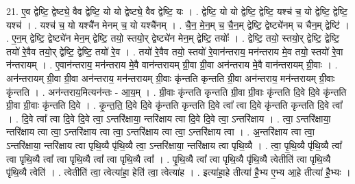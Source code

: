 \documentclass[17pt]{extarticle}
\begin{document}
21. ए॒व द्वेष्टि॒ द्वेष्ट्ये॒ वैव द्वेष्टि॒ यो यो द्वेष्ट्ये॒ वैव द्वेष्टि॒ यः । . द्वेष्टि॒ यो यो द्वेष्टि॒ द्वेष्टि॒ यश्च॑ च॒ यो द्वेष्टि॒ द्वेष्टि॒ यश्च॑ । . यश्च॑ च॒ यो यश्चै॑न मेनम् च॒ यो यश्चै॑नम् । . चै॒न॒ मे॒न॒म् च॒ चै॒न॒म् द्वेष्टि॒ द्वेष्ट्ये॑नम् च चैन॒म् द्वेष्टि॑ । . ए॒न॒म् द्वेष्टि॒ द्वेष्ट्ये॑न मेन॒म् द्वेष्टि॒ तयो॒ स्तयो॒र् द्वेष्ट्ये॑न मेन॒म् द्वेष्टि॒ तयोः᳚ । . द्वेष्टि॒ तयो॒ स्तयो॒र् द्वेष्टि॒ द्वेष्टि॒ तयो॑ रे॒वैव तयो॒र् द्वेष्टि॒ द्वेष्टि॒ तयो॑ रे॒व । . तयो॑ रे॒वैव तयो॒ स्तयो॑ रे॒वान॑न्तराय॒ मन॑न्तराय मे॒व तयो॒ स्तयो॑ रे॒वा न॑न्तरायम् । . ए॒वान॑न्तराय॒ मन॑न्तराय मे॒वै वान॑न्तरायम् ग्री॒वा ग्री॒वा अन॑न्तराय मे॒वै वान॑न्तरायम् ग्री॒वाः । . अन॑न्तरायम् ग्री॒वा ग्री॒वा अन॑न्तराय॒ मन॑न्तरायम् ग्री॒वाः कृ॑न्तति कृन्तति ग्री॒वा अन॑न्तराय॒ मन॑न्तरायम् ग्री॒वाः कृ॑न्तति । . अन॑न्तराय॒मित्यन॑न्तः - आ॒य॒म् । . ग्री॒वाः कृ॑न्तति कृन्तति ग्री॒वा ग्री॒वाः कृ॑न्तति दि॒वे दि॒वे कृ॑न्तति ग्री॒वा ग्री॒वाः कृ॑न्तति दि॒वे । . कृ॒न्त॒ति॒ दि॒वे दि॒वे कृ॑न्तति कृन्तति दि॒वे त्वा᳚ त्वा दि॒वे कृ॑न्तति कृन्तति दि॒वे त्वा᳚ । . दि॒वे त्वा᳚ त्वा दि॒वे दि॒वे त्वा॒ ऽन्तरि॑क्षाया॒ न्तरि॑क्षाय त्वा दि॒वे दि॒वे त्वा॒ ऽन्तरि॑क्षाय । . त्वा॒ ऽन्तरि॑क्षाया॒ न्तरि॑क्षाय त्वा त्वा॒ ऽन्तरि॑क्षाय त्वा त्वा॒ ऽन्तरि॑क्षाय त्वा त्वा॒ ऽन्तरि॑क्षाय त्वा । . अ॒न्तरि॑क्षाय त्वा त्वा॒ ऽन्तरि॑क्षाया॒ न्तरि॑क्षाय त्वा पृथि॒व्यै पृ॑थि॒व्यै त्वा॒ ऽन्तरि॑क्षाया॒ न्तरि॑क्षाय त्वा पृथि॒व्यै । . त्वा॒ पृ॒थि॒व्यै पृ॑थि॒व्यै त्वा᳚ त्वा पृथि॒व्यै त्वा᳚ त्वा पृथि॒व्यै त्वा᳚ त्वा पृथि॒व्यै त्वा᳚ । . पृ॒थि॒व्यै त्वा᳚ त्वा पृथि॒व्यै पृ॑थि॒व्यै त्वेतीति॑ त्वा पृथि॒व्यै पृ॑थि॒व्यै त्वेति॑ । . त्वेतीति॑ त्वा॒ त्वेत्या॑हा॒ हेति॑ त्वा॒ त्वेत्या॑ह । . इत्या॑हा॒हे तीत्या॑ है॒भ्य ए॒भ्य आ॒हे तीत्या॑ है॒भ्यः । \newline
\end{document}
